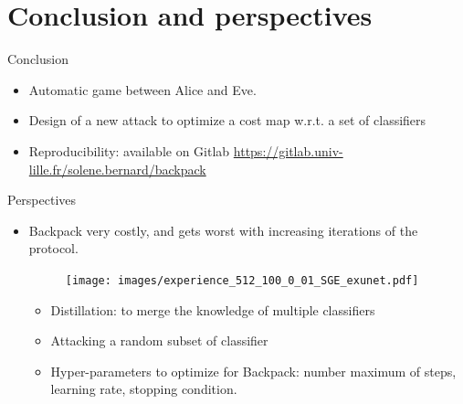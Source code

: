 \documentclass[10pt]{beamer}
\begin{document}
\section{Conclusion and perspectives}


\begin{frame}{Conclusion}
    \begin{itemize}
        \item Automatic game between Alice and Eve. 
        \pause
        \item Design of a new attack to optimize a cost map w.r.t. a set of classifiers
        \pause
        \item Reproducibility: available on Gitlab \url{https://gitlab.univ-lille.fr/solene.bernard/backpack}

    \end{itemize}
\end{frame}


\begin{frame}{Perspectives}
    \begin{itemize}
        \item Backpack very costly, and gets worst with increasing iterations of the protocol. 
        
        \begin{figure}[h]
            \texttt{[image: images/experience\_512\_100\_0\_01\_SGE\_exunet.pdf]}
        \end{figure}

        \pause

        \begin{itemize}
            \item Distillation: to merge the knowledge of multiple classifiers
            \item Attacking a random subset of classifier
            \item Hyper-parameters to optimize for Backpack: number maximum of steps, learning rate, stopping condition.
        \end{itemize}

    \end{itemize}

\end{frame}
\end{document}
